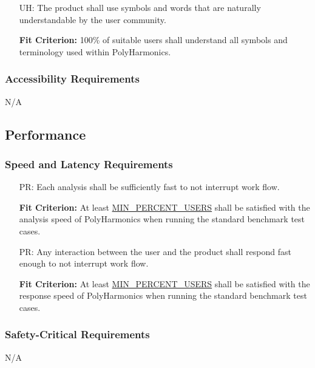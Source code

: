 \documentclass[12pt]{article}
\newcounter{uahnum}
\newcounter{perfnum}
\newcommand{\progname}{PolyHarmonics}
\begin{document}
\noindent \begin{itemize}
\item[UH\refstepcounter{uahnum}\theuahnum\label{NF_UaPR}:] The product shall use
  symbols and words that are naturally understandable by the user community.

  \textbf{Fit Criterion:} 100\% of suitable users shall understand all symbols
  and terminology used within \progname{}.
\end{itemize}

\subsubsection{Accessibility Requirements}

N/A

\subsection{Performance}

\subsubsection{Speed and Latency Requirements}

\noindent \begin{itemize}
\item[PR\refstepcounter{perfnum}\theperfnum\label{NF_SL1}:] Each analysis
 shall be sufficiently fast to not interrupt work flow.

  \textbf{Fit Criterion:} At least \hyperref[AppendA]{MIN\_PERCENT\_USERS} 
  shall be satisfied with the analysis speed of \progname{} when running the
  standard benchmark test cases.
  
\item[PR\refstepcounter{perfnum}\theperfnum\label{NF_SL2}:]Any interaction
  between the user and the product shall respond fast enough to not interrupt 
  work flow.

  \textbf{Fit Criterion:} At least \hyperref[AppendA]{MIN\_PERCENT\_USERS} 
  shall be satisfied with the response speed of \progname{} when running the
  standard benchmark test cases.
\end{itemize}

\subsubsection{Safety-Critical Requirements}

N/A
\end{document}
